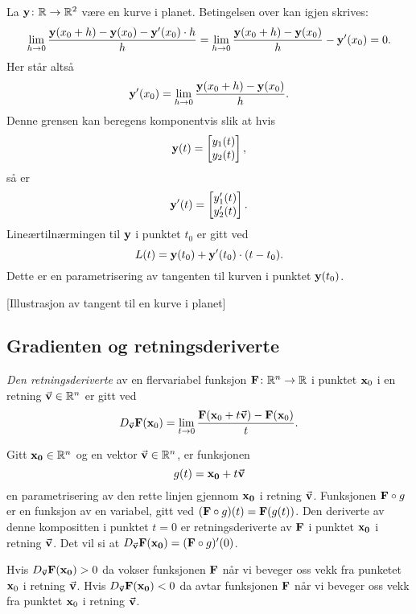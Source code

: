 \begin{eksempel}
  La $\mathbf{y} \colon \mathbb{R} \to \mathbb{R}^2$ være en kurve i planet. Betingelsen over kan igjen skrives:
  $$\lim_{h\to 0} \frac{\mathbf{y}(x_0+h) - \mathbf{y}(x_0) - \mathbf{y}'(x_0) \cdot h}{h} =
  \lim_{h\to 0} \frac{\mathbf{y}(x_0+h) - \mathbf{y}(x_0)}{h} - \mathbf{y}'(x_0) = 0.$$
  Her står altså 
  $$\mathbf{y}'(x_0) = \lim_{h\to 0} \frac{\mathbf{y}(x_0+h) - \mathbf{y}(x_0)}{h}.$$
  Denne grensen kan beregens komponentvis slik at hvis 
  $$\mathbf{y}(t) =
  \begin{bmatrix} y_1(t) \\ y_2(t) \end{bmatrix},$$ så er 
  $$\mathbf{y}'(t) =
  \begin{bmatrix} y_1'(t) \\ y_2'(t) \end{bmatrix}.$$
  Lineærtilnærmingen til $\mathbf{y}$ i punktet $t_0$ er gitt ved
  $$L(t) = \mathbf{y}(t_0) + \mathbf{y}'(t_0) \cdot (t - t_0).$$
  Dette er en parametrisering av tangenten til kurven i punktet $\mathbf{y}(t_0)$.
\end{eksempel}
[Illustrasjon av tangent til en kurve i planet]
\subsection{Gradienten og retningsderiverte}
\begin{definisjon}
  {\em Den retningsderiverte} av en flervariabel funksjon $\mathbf{F} \colon \mathbb{R}^n \to
  \mathbb{R}$ i punktet $\mathbf{x}_0$ i en retning $\vec{\mathbf{v}} \in \mathbb{R}^n$ er gitt ved
  $$D_{\vec{\mathbf{v}}} \mathbf{F}(\mathbf{x}_0) = \lim_{t\to 0} \frac{\mathbf{F}(\mathbf{x}_0 + t\vec{\mathbf{v}}) - \mathbf{F}(\mathbf{x}_0)}{t}.$$
\end{definisjon}
Gitt $\mathbf{x_0} \in \mathbb{R}^n$ og en vektor $\vec{\mathbf{v}} \in \mathbb{R}^n$, er funksjonen 
$$g(t) = \mathbf{x_0} + t\vec{\mathbf{v}}$$
en parametrisering av den rette linjen gjennom $\mathbf{x_0}$ i retning $\vec{\mathbf{v}}$.
Funksjonen $\mathbf{F} \circ g$ er en funksjon av en variabel, gitt ved $(\mathbf{F} \circ g)(t) = \mathbf{F}(g(t))$.
Den deriverte av denne kompositten
i punktet $t=0$ er retningsderiverte av $\mathbf{F}$ i punktet $\mathbf{x_0}$ i retning
$\vec{\mathbf{v}}$. Det vil si at
$D_{\vec{\mathbf{v}}} \mathbf{F}(\mathbf{x_0}) = (\mathbf{F} \circ g)'(0)$.

Hvis $D_{\vec{\mathbf{v}}} \mathbf{F}(\mathbf{x_0}) > 0$ da vokser funksjonen $\mathbf{F}$ når vi beveger oss
vekk fra punketet $\mathbf{x}_0$ i retning $\vec{\mathbf{v}}$. Hvis $D_{\vec{\mathbf{v}}} \mathbf{F}(\mathbf{x_0}) < 0$ da
avtar funksjonen $\mathbf{F}$ når vi beveger oss vekk fra punktet $\mathbf{x}_0$ i retning $\vec{\mathbf{v}}$.

